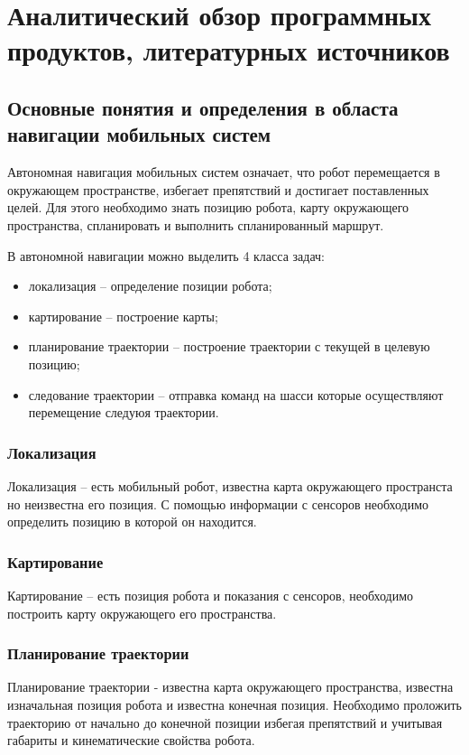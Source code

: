 \section{Аналитический обзор программных продуктов, литературных источников}

\subsection{Основные понятия и определения в областа навигации мобильных систем } 


Автономная навигация мобильных систем означает, что робот перемещается в
окружающем пространстве, избегает препятствий и достигает поставленных целей.
Для этого необходимо знать позицию робота, карту окружающего пространства,
спланировать и выполнить спланированный маршрут.

В автономной навигации можно выделить 4 класса задач:
\begin{itemize}
	\item локализация -- определение позиции робота;
	\item картирование -- построение карты;
	\item планирование траектории -- построение траектории с текущей в целевую
		позицию;
	\item следование траектории -- отправка команд на шасси которые
		осуществляют перемещение следуюя траектории.
\end{itemize}

\subsubsection{Локализация}
Локализация -- есть мобильный робот, известна карта окружающего пространста но
неизвестна его позиция. С помощью информации с сенсоров необходимо определить
позицию в которой он находится.

\subsubsection{Картирование}
Картирование -- есть позиция робота и показания с сенсоров, необходимо
построить карту окружающего его пространства.

\subsubsection{Планирование траектории}
Планирование траектории - известна карта окружающего пространства, известна
изначальная позиция робота и известна конечная позиция. Необходимо проложить
траекторию от начально до конечной позиции избегая препятствий и учитывая
габариты и кинематические свойства робота.

